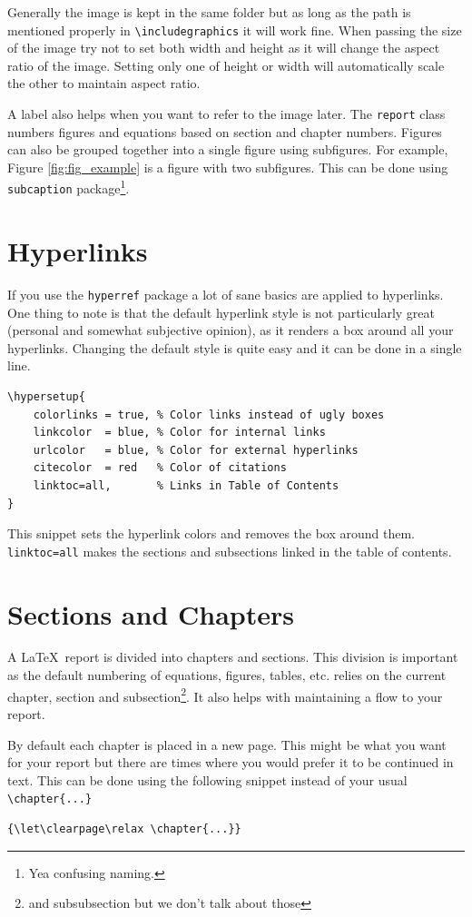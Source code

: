 	Generally the image is kept in the same folder but as long as the path is mentioned properly in \lstinline|\includegraphics| it will work fine. When passing the size of the image try not to set both width and height as it will change the aspect ratio of the image. Setting only one of height or width will automatically scale the other to maintain aspect ratio.

	A label also helps when you want to refer to the image later. The \texttt{report} class numbers figures and equations based on section and chapter numbers. Figures can also be grouped together into a single figure using subfigures. For example, Figure \ref{fig:fig_example} is a figure with two subfigures. This can be done using \verb*|subcaption| package\footnote{Yea confusing naming.}.

	\section{Hyperlinks}
	\begingroup
	If you use the \texttt{hyperref} package a lot of sane basics are applied to hyperlinks. One thing to note is that the default hyperlink style is not particularly great (personal and somewhat subjective opinion), as it renders a box around all your hyperlinks. Changing the default style is quite easy and it can be done in a single line.
	\endgroup
	\begin{lstlisting}[style=mystyle]
\hypersetup{
	colorlinks = true, % Color links instead of ugly boxes
	linkcolor  = blue, % Color for internal links
	urlcolor   = blue, % Color for external hyperlinks
	citecolor  = red   % Color of citations
	linktoc=all,       % Links in Table of Contents
}\end{lstlisting}
	This snippet sets the hyperlink colors and removes the box around them. \texttt{linktoc=all} makes the sections and subsections linked in the table of contents.

	\section{Sections and Chapters}
	A \LaTeX\ report is divided into chapters and sections. This division is important as the default numbering of equations, figures, tables, etc. relies on the current chapter, section and subsection\footnote{and subsubsection but we don't talk about those}. It also helps with maintaining a flow to your report.

	By default each chapter is placed in a new page. This might be what you want for your report but there are times where you would prefer it to be continued in text. This can be done using the following snippet instead of your usual \lstinline[style=mystyle]|\chapter{...}|
	\begin{lstlisting}[style=mystyle]
{\let\clearpage\relax \chapter{...}}\end{lstlisting}


